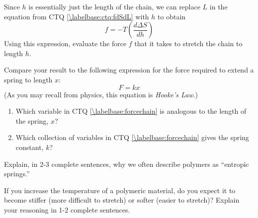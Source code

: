 \begin{activity}
\begin{ctqs}
	\question Since $h$ is essentially just the length of the chain, we can replace $L$ in the equation from CTQ \ref{\labelbase:ctq:fdSdL} with $h$ to obtain
		\begin{equation*}
			f = -T\left(\frac{d\Delta S}{dh}\right)
		\end{equation*}
		Using this expression, evaluate the force $f$ that it takes to stretch the chain to length $h$.
		
		\begin{solution}[2in]
		\end{solution}
		
	\question Compare your result to the following expression for the force required to extend a spring to length $x$:
		\begin{equation*}
			F = kx
		\end{equation*}
		(As you may recall from physics, this equation is \emph{Hooke's Law}.)
		
		\begin{enumerate}
			\item Which variable in CTQ \ref{\labelbase:forcechain} is analogous to the length of the spring, $x$?
		
				\begin{solution}[1in]
				\end{solution}
			
			\item Which collection of variables in CTQ \ref{\labelbase:forcechain} gives the spring constant, $k$?
		
				\begin{solution}[1in]
				\end{solution}
			
		\end{enumerate}
		
	\question Explain, in 2-3 complete sentences, why we often describe polymers as ``entropic springs.''
	
		\begin{solution}[2in]
		\end{solution}
	
\end{ctqs}
	
	
\begin{exercises}
	\exercise If you increase the temperature of a polymeric material, do you expect it to become stiffer (more difficult to stretch) or softer (easier to stretch)?  Explain your reasoning in 1-2 complete sentences.
\end{exercises}
	
\end{activity}